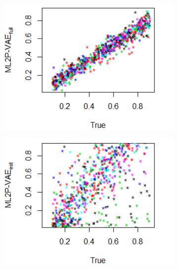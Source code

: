 \begin{figure}[h]
\centering
{}\\
    \begin{subfigure}{.32\textwidth}
      \centering
      \includegraphics[width=.9\linewidth]{img/ml_journal_results/20skills/vae_full_disc_20skills.png}
    \end{subfigure}
    \begin{subfigure}{.32\textwidth}
      \centering
      \includegraphics[width=.9\linewidth]{img/ml_journal_results/20skills/vae_est_disc_20skills.png}
    \end{subfigure}
    \begin{subfigure}{.32\textwidth}
      \centering

\end{subfigure}
\end{figure}
